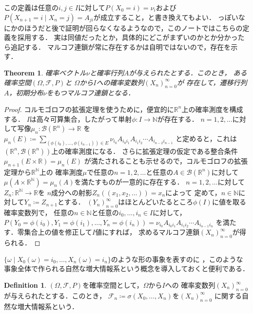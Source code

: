 \documentclass[dvipdfmx,autodetect-engine]{jsarticle}
\newtheorem{theorem}{Theorem}[section]
\theoremstyle{remark}
\theoremstyle{definition}
\newtheorem{definition}{Definition}[section]
\newcommand{\R}{\mathbb{R}}
\newcommand{\N}{\mathbb{N}}
\begin{document}
この定義は任意の$i,j \in I$に対して$P(X_0 = i)=\nu_{i}$および
$P(X_{n+1} = i \mid X_n = j)= A_{ji}$が成立すること，と書き換えてもよい．
っぽいなにかのほうだと後で証明が回らなくなるようなので，このノートではこちらの定義を採用する．
実は同値だったとか，具体的にどこがまずいのかとか分かったら追記する．
マルコフ連鎖が常に存在するかは自明ではないので，存在を示す．


\begin{theorem}
    確率ベクトル$\nu$と確率行列$A$が与えられたとする．このとき，
    ある確率空間$(\Omega,\mathcal{F},P)$と
    $\Omega$から$I$への確率変数列$(X_n)_{n=0}^{\infty}$が
    存在して，遷移行列$A$，初期分布$\nu$をもつマルコフ連鎖となる．
\end{theorem}

\begin{proof}
    コルモゴロフの拡張定理を使うために，便宜的に$\R^n$上の確率測度を構成する．
    $I$は高々可算集合，したがって単射$\phi \colon I \to \N$が存在する．
    $n =1,2,\ldots $に対して写像$\mu_n \colon \mathcal{B}(\R^n) \to \R$
    を$\mu_n (E) \coloneqq \sum_{(\phi(i_0),\ldots,\phi(i_{n-1}) ) \in E} 
    \nu_{i_0} A_{i_0 i_1} A_{i_1 i_2} \cdots A_{i_{n-2} i_{n-1}}$
    と定めると，これは$(\R^n , \mathcal{B}(\R^n))$上の確率測度になる．
    さらに拡張定理の仮定である整合条件$\mu_{n+1}(E\times \R) = \mu_n (E)$
    が満たされることも示せるので，コルモゴロフの拡張定理から$\R^{\N}$上の
    確率測度$\mu$で任意の$n=1,2,\ldots$と任意の$A \in \mathcal{B}(\R^n)$に対して
    $\mu(A\times \R^{\N}) = \mu_n(A)$を満たすものが一意的に存在する．
    $n=1,2,\ldots$に対して$Z_n \colon\R^{\N} \to \R$を
    $n$成分への射影$Z_n((x_1,x_2,\ldots))=x_n$によって
    定めて，$n \in \N$に対して$Y_n \coloneqq Z_{n+1}$とする．
    $(Y_n)_{n=0}^{\infty}$はほとんどいたるところ$\phi(I)$に値を取る確率変数列で，
    任意の$n \in \N$と任意の$i_0,\ldots,i_{n} \in I$に対して，
    $P(Y_{0} = \phi(i_{0}), Y_{1}=\phi(i_{1}),\ldots,Y_n = \phi(i_n)) = 
    \nu_{i_0} A_{i_0 i_1} A_{i_1 i_2}\cdots A_{i_{n-1} i_n}$
    を満たす．零集合上の値を修正して$I$値にすれば，
    求めるマルコフ連鎖$(X_n)_{n=0}^{\infty}$が得られる．
\end{proof}

$\{ \omega \mid X_0 (\omega)= i_0,\ldots, X_n (\omega)= i_n\}$のような形の事象を表すのに
，このような事象全体で作られる自然な増大情報系という概念を導入しておくと便利である．
\begin{definition}
    $(\Omega,\mathcal{F},P)$を確率空間として，$\Omega$から$I$への
    確率変数列$(X_n)_{n=0}^{\infty}$が与えられたとする．このとき，
    $\mathcal{F}_n \coloneqq \sigma (X_0,\ldots,X_n)$を$(X_n)_{n=0}^{\infty}$
    に関する自然な増大情報系という．
\end{definition}
\end{document}
